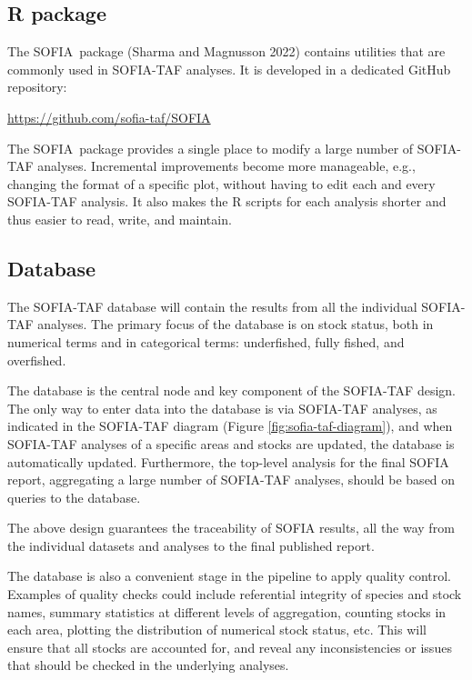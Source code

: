 \documentclass[12pt]{article}
\newcommand\blue[1]{\textcolor{darkblue}{#1}}
\newcommand\SOFIA{{\sf SOFIA}}
\begin{document}
\subsection{R package}

The \SOFIA\ package (Sharma and Magnusson 2022) contains utilities that are
commonly used in SOFIA-TAF analyses. It is developed in a dedicated GitHub
repository:

\qquad\blue{\url{https://github.com/sofia-taf/SOFIA}}

The \SOFIA\ package provides a single place to modify a large number of
SOFIA-TAF analyses. Incremental improvements become more manageable, e.g.,
changing the format of a specific plot, without having to edit each and every
SOFIA-TAF analysis. It also makes the R scripts for each analysis shorter and
thus easier to read, write, and maintain.

\subsection{Database}

The SOFIA-TAF database will contain the results from all the individual
SOFIA-TAF analyses. The primary focus of the database is on stock status, both
in numerical terms and in categorical terms: underfished, fully fished, and
overfished.

The database is the central node and key component of the SOFIA-TAF design. The
only way to enter data into the database is via SOFIA-TAF analyses, as indicated
in the SOFIA-TAF diagram (Figure \ref{fig:sofia-taf-diagram}), and when
SOFIA-TAF analyses of a specific areas and stocks are updated, the database is
automatically updated. Furthermore, the top-level analysis for the final SOFIA
report, aggregating a large number of SOFIA-TAF analyses, should be based on
queries to the database.

The above design guarantees the traceability of SOFIA results, all the way from
the individual datasets and analyses to the final published report.

The database is also a convenient stage in the pipeline to apply quality
control. Examples of quality checks could include referential integrity of
species and stock names, summary statistics at different levels of aggregation,
counting stocks in each area, plotting the distribution of numerical stock
status, etc. This will ensure that all stocks are accounted for, and reveal any
inconsistencies or issues that should be checked in the underlying analyses.
\end{document}

